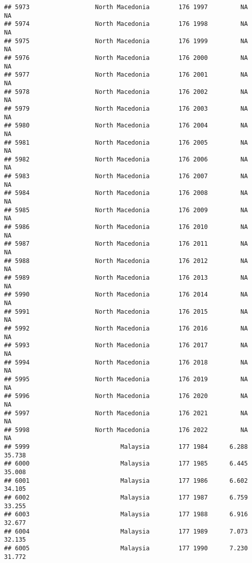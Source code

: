 \documentclass[
]{article}
\begin{document}
\begin{verbatim}
## 5973                  North Macedonia        176 1997         NA         NA
## 5974                  North Macedonia        176 1998         NA         NA
## 5975                  North Macedonia        176 1999         NA         NA
## 5976                  North Macedonia        176 2000         NA         NA
## 5977                  North Macedonia        176 2001         NA         NA
## 5978                  North Macedonia        176 2002         NA         NA
## 5979                  North Macedonia        176 2003         NA         NA
## 5980                  North Macedonia        176 2004         NA         NA
## 5981                  North Macedonia        176 2005         NA         NA
## 5982                  North Macedonia        176 2006         NA         NA
## 5983                  North Macedonia        176 2007         NA         NA
## 5984                  North Macedonia        176 2008         NA         NA
## 5985                  North Macedonia        176 2009         NA         NA
## 5986                  North Macedonia        176 2010         NA         NA
## 5987                  North Macedonia        176 2011         NA         NA
## 5988                  North Macedonia        176 2012         NA         NA
## 5989                  North Macedonia        176 2013         NA         NA
## 5990                  North Macedonia        176 2014         NA         NA
## 5991                  North Macedonia        176 2015         NA         NA
## 5992                  North Macedonia        176 2016         NA         NA
## 5993                  North Macedonia        176 2017         NA         NA
## 5994                  North Macedonia        176 2018         NA         NA
## 5995                  North Macedonia        176 2019         NA         NA
## 5996                  North Macedonia        176 2020         NA         NA
## 5997                  North Macedonia        176 2021         NA         NA
## 5998                  North Macedonia        176 2022         NA         NA
## 5999                         Malaysia        177 1984      6.288     35.738
## 6000                         Malaysia        177 1985      6.445     35.008
## 6001                         Malaysia        177 1986      6.602     34.105
## 6002                         Malaysia        177 1987      6.759     33.255
## 6003                         Malaysia        177 1988      6.916     32.677
## 6004                         Malaysia        177 1989      7.073     32.135
## 6005                         Malaysia        177 1990      7.230     31.772

\end{verbatim}
\end{document}
